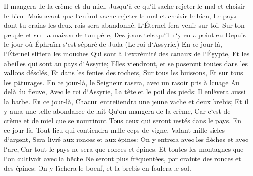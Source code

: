 \verse Il mangera de la crème et du miel, Jusqu`à ce qu`il sache rejeter le mal et choisir le bien. 
\verse Mais avant que l`enfant sache rejeter le mal et choisir le bien, Le pays dont tu crains les deux rois sera abandonné. 
\verse L`Éternel fera venir sur toi, Sur ton peuple et sur la maison de ton père, Des jours tels qu`il n`y en a point eu Depuis le jour où Éphraïm s`est séparé de Juda (Le roi d`Assyrie.) 
\verse En ce jour-là, l`Éternel sifflera les mouches Qui sont à l`extrémité des canaux de l`Égypte, Et les abeilles qui sont au pays d`Assyrie; 
\verse Elles viendront, et se poseront toutes dans les vallons désolés, Et dans les fentes des rochers, Sur tous les buissons, Et sur tous les pâturages. 
\verse En ce jour-là, le Seigneur rasera, avec un rasoir pris à louage Au delà du fleuve, Avec le roi d`Assyrie, La tête et le poil des pieds; Il enlèvera aussi la barbe. 
\verse En ce jour-là, Chacun entretiendra une jeune vache et deux brebis; 
\verse Et il y aura une telle abondance de lait Qu`on mangera de la crème, Car c`est de crème et de miel que se nourriront Tous ceux qui seront restés dans le pays. 
\verse En ce jour-là, Tout lieu qui contiendra mille ceps de vigne, Valant mille sicles d`argent, Sera livré aux ronces et aux épines: 
\verse On y entrera avec les flèches et avec l`arc, Car tout le pays ne sera que ronces et épines. 
\verse Et toutes les montagnes que l`on cultivait avec la bêche Ne seront plus fréquentées, par crainte des ronces et des épines: On y lâchera le boeuf, et la brebis en foulera le sol. 

